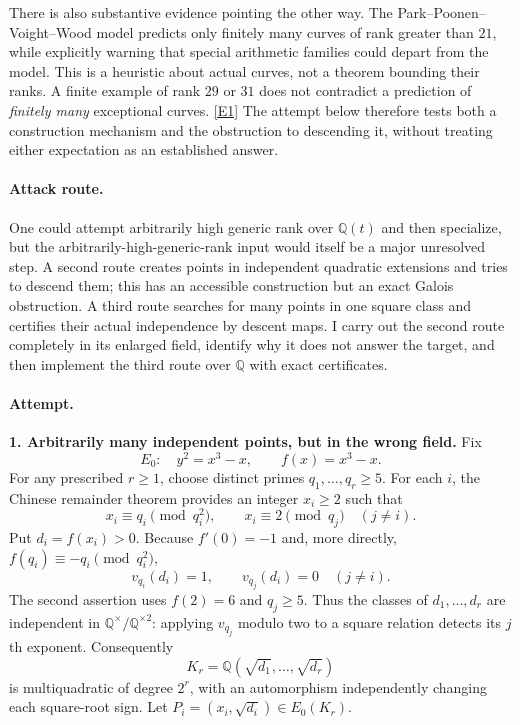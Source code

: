 \documentclass[11pt,a4paper]{article}
\newcommand{\Q}{\mathbb{Q}}
\newcommand{\eref}[2]{\hyperlink{extra:#1:#2}{[E#2]}}
\numberwithin{equation}{section}
\begin{document}
There is also substantive evidence pointing the other way. The
Park--Poonen--Voight--Wood model predicts only finitely many curves of rank
greater than $21$, while explicitly warning that special arithmetic families
could depart from the model. This is a heuristic about actual curves, not
a theorem bounding their ranks. A finite example of rank $29$ or $31$ does
not contradict a prediction of \emph{finitely many} exceptional curves.
\eref{statement}{1} The attempt below therefore tests both a construction mechanism
and the obstruction to descending it, without treating either expectation
as an established answer.

\paragraph{Attack route.}
One could attempt arbitrarily high generic rank over $\Q(t)$ and then
specialize, but the arbitrarily-high-generic-rank input would itself be a
major unresolved step. A second route creates points in independent quadratic
extensions and tries to descend them; this has an accessible construction
but an exact Galois obstruction. A third route searches for many points in
one square class and certifies their actual independence by descent maps.
I carry out the second route completely in its enlarged field, identify why
it does not answer the target, and then implement the third route over
$\Q$ with exact certificates.

\paragraph{Attempt.}
\textbf{1. Arbitrarily many independent points, but in the wrong field.}
Fix
\[
 E_0:\quad y^2=x^3-x,
 \qquad f(x)=x^3-x.
\]
For any prescribed $r\geq1$, choose distinct primes $q_1,\ldots,q_r\geq5$.
For each $i$, the Chinese remainder theorem provides an integer $x_i\geq2$
such that
\begin{equation}\label{statement:crt}
 x_i\equiv q_i\pmod{q_i^2},\qquad
 x_i\equiv2\pmod{q_j}\quad(j\neq i).
\end{equation}
Put $d_i=f(x_i)>0$. Because $f'(0)=-1$ and, more directly,
$f(q_i)\equiv-q_i\pmod{q_i^2}$,
\[
 v_{q_i}(d_i)=1,\qquad v_{q_j}(d_i)=0\quad(j\neq i).
\]
The second assertion uses $f(2)=6$ and $q_j\geq5$. Thus the classes of
$d_1,\ldots,d_r$ are independent in $\Q^\times/\Q^{\times2}$: applying
$v_{q_j}$ modulo two to a square relation detects its $j$th exponent.
Consequently
\[
 K_r=\Q(\sqrt{d_1},\ldots,\sqrt{d_r})
\]
is multiquadratic of degree $2^r$, with an automorphism independently
changing each square-root sign. Let $P_i=(x_i,\sqrt{d_i})\in E_0(K_r)$.
\end{document}
